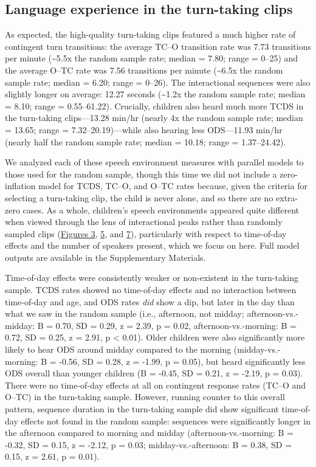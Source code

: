 \documentclass[floatsintext,man]{apa6}
\theoremstyle{definition}
\theoremstyle{definition}
\theoremstyle{definition}
\theoremstyle{remark}
\begin{document}
\subsection{Language experience in the turn-taking
clips}\label{language-experience-in-the-turn-taking-clips}

As expected, the high-quality turn-taking clips featured a much higher
rate of contingent turn transitions: the average TC--O transition rate
was 7.73 transitions per minute (\textasciitilde{}5.5x the random sample
rate; median = 7.80; range = 0--25) and the average O--TC rate was 7.56
transitions per minute (\textasciitilde{}6.5x the random sample rate;
median = 6.20; range = 0--26). The interactional sequences were also
slightly longer on average: 12.27 seconds (\textasciitilde{}1.2x the
random sample rate; median = 8.10; range = 0.55--61.22). Crucially,
children also heard much more TCDS in the turn-taking clips---13.28
min/hr (nearly 4x the random sample rate; median = 13.65; range =
7.32--20.19)---while also hearing less ODS---11.93 min/hr (nearly half
the random sample rate; median = 10.18; range = 1.37--24.42).

We analyzed each of these speech environment measures with parallel
models to those used for the random sample, though this time we did not
include a zero-inflation model for TCDS, TC--O, and O--TC rates because,
given the criteria for selecting a turn-taking clip, the child is never
alone, and so there are no extra-zero cases. As a whole, children's
speech environments appeared quite different when viewed through the
lens of interactional peaks rather than randomly sampled clips
(\protect\hyperlink{fig3}{Figures 3}, \protect\hyperlink{fig5}{5}, and
\protect\hyperlink{fig7}{7}), particularly with respect to time-of-day
effects and the number of speakers present, which we focus on here. Full
model outputs are available in the Supplementary Materials.

Time-of-day effects were consistently weaker or non-existent in the
turn-taking sample. TCDS rates showed no time-of-day effects and no
interaction between time-of-day and age, and ODS rates \emph{did} show a
dip, but later in the day than what we saw in the random sample (i.e.,
afternoon, not midday; afternoon-vs.-midday: B = 0.70, SD = 0.29, z =
2.39, p = 0.02, afternoon-vs.-morning: B = 0.72, SD = 0.25, z = 2.91, p
\textless{} 0.01). Older children were also significantly more likely to
hear ODS around midday compared to the morning (midday-vs.-morning: B =
-0.56, SD = 0.28, z = -1.99, p = 0.05), but heard significantly less ODS
overall than younger children (B = -0.45, SD = 0.21, z = -2.19, p =
0.03). There were no time-of-day effects at all on contingent response
rates (TC--O and O--TC) in the turn-taking sample. However, running
counter to this overall pattern, sequence duration in the turn-taking
sample did show significant time-of-day effects not found in the random
sample: sequences were significantly longer in the afternoon compared to
morning and midday (afternoon-vs.-morning: B = -0.32, SD = 0.15, z =
-2.12, p = 0.03; midday-vs.-afternoon: B = 0.38, SD = 0.15, z = 2.61, p
= 0.01).
\end{document}
